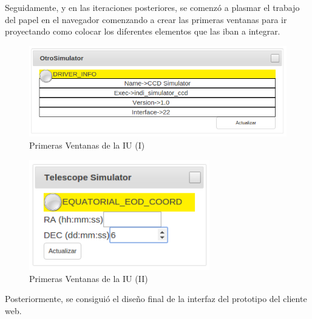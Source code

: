 Seguidamente, y en las iteraciones posteriores, se comenzó a plasmar el trabajo del papel en el navegador comenzando a crear las primeras ventanas para ir proyectando como colocar los diferentes elementos que las iban a integrar.

\begin{figure}[htb]
\centering
\includegraphics[width=1\textwidth]{./imagenes/primerasVentanas1}
\caption{Primeras Ventanas de la IU (I)} \label{fig:primerasVentanas1}
\end{figure}

\begin{figure}[htb]
\centering
\includegraphics[width=0.7\textwidth]{./imagenes/primerasVentanas2}
\caption{Primeras Ventanas de la IU (II)} \label{fig:primerasVentanas2}
\end{figure}

Posteriormente, se consiguió el diseño final de la interfaz del prototipo del cliente web.\\ \\

